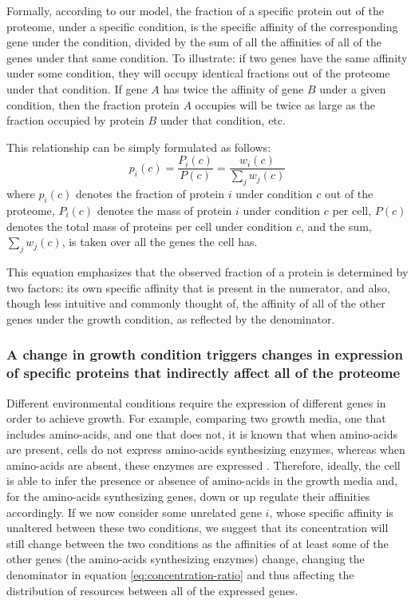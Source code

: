 \documentclass[a4paper]{article}
\begin{document}
Formally, according to our model, the fraction of a specific protein out of the proteome, under a specific condition, is the specific affinity of the corresponding gene under the condition, divided by the sum of all the affinities of all of the genes under that same condition.
To illustrate: if two genes have the same affinity under some condition, they will occupy identical fractions out of the proteome under that condition.
If gene $A$ has twice the affinity of gene $B$ under a given condition, then the fraction protein  $A$ occupies will be twice as large as the fraction occupied by protein $B$ under that condition, etc.

This relationship can be simply formulated as follows:
\begin{equation}
  \label{eq:concentration-ratio}
  p_i(c)=\frac{P_i(c)}{P(c)}=\frac{w_i(c)}{\sum_jw_j(c)}
\end{equation}
where $p_i(c)$ denotes the fraction of protein $i$ under condition $c$ out of the proteome, $P_i(c)$ denotes the mass of protein $i$ under condition $c$ per cell, $P(c)$ denotes the total mass of proteins per cell under condition $c$, and the sum, $\sum_jw_j(c)$, is taken over all the genes the cell has.

This equation emphasizes that the observed fraction of a protein is determined by two factors: its own specific affinity that is present in the numerator, and also, though less intuitive and commonly thought of, the affinity of all of the other genes under the growth condition, as reflected by the denominator.


\subsubsection{A change in growth condition triggers changes in expression of specific proteins that indirectly affect all of the proteome}
Different environmental conditions require the expression of different genes in order to achieve growth.
For example, comparing two growth media, one that includes amino-acids, and one that does not, it is known that when amino-acids are present, cells do not express amino-acids synthesizing enzymes, whereas when amino-acids are absent, these enzymes are expressed \cite{24656150,10515934}.
Therefore, ideally, the cell is able to infer the presence or absence of amino-acids in the growth media and, for the amino-acids synthesizing genes, down or up regulate their affinities accordingly.
If we now consider some unrelated gene $i$, whose specific affinity is unaltered between these two conditions, we suggest that its concentration will still change between the two conditions as the affinities of at least some of the other genes (the amino-acids synthesizing enzymes) change, changing the denominator in equation \ref{eq:concentration-ratio} and thus affecting the distribution of resources between all of the expressed genes.
\end{document}
